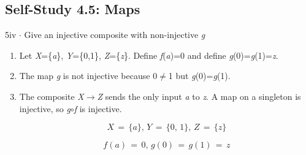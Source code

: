 \documentclass[11pt]{article}
\begin{document}
\begin{keepsection}\subsection{Self-Study 4.5: Maps}

\begin{workedbox}{5iv \ensuremath{\cdot} Give an injective composite with non-injective \textit{g}}
\begin{enumerate}
\item Let \textit{X}=\{\textit{a}\}, \textit{Y}=\{0,1\}, \textit{Z}=\{\textit{z}\}. Define \textit{f}(\textit{a})=0 and define \textit{g}(0)=\textit{g}(1)=\textit{z}.
\item The map \textit{g} is not injective because 0\ensuremath{\neq}1 but \textit{g}(0)=\textit{g}(1).
\item {}
The composite \textit{X}\ensuremath{\to}\textit{Z} sends the only input \textit{a} to \textit{z}. A map on a singleton is injective, so \textit{g}\ensuremath{\circ}\textit{f} is injective.

\begin{equation*}{X}\, =\, \{{a}\},\, {Y}\, =\, \{0,\, 1\},\, {Z}\, =\, \{{z}\}\end{equation*}

\begin{equation*}{f}({a})\, =\, 0,\, {g}(0)\, =\, {g}(1)\, =\, {z}\end{equation*}
\end{enumerate}
\end{workedbox}

\end{keepsection}
\end{document}
